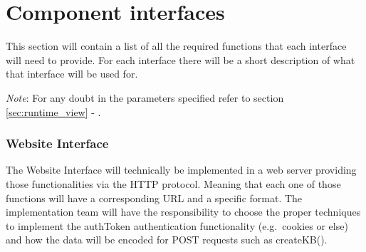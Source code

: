 \documentclass[11pt]{report}
\begin{document}
\cleardoublepage

\section{Component interfaces} \label{sec:component_interfaces}
This section will contain a list of all the required functions that each interface will need to provide.
For each interface there will be a short description of what that interface will be used for.

\emph{Note}: For any doubt in the parameters specified refer to section \ref{sec:runtime_view} - .

\subsubsection {Website Interface}
The Website Interface will technically be implemented in a web server providing those functionalities via the HTTP protocol.
Meaning that each one of those functions will have a corresponding URL and a specific format.
The implementation team will have the responsibility to choose the proper techniques to implement the authToken authentication functionality (e.g.\ cookies or else)
and how the data will be encoded for POST requests such as createKB().
\end{document}
